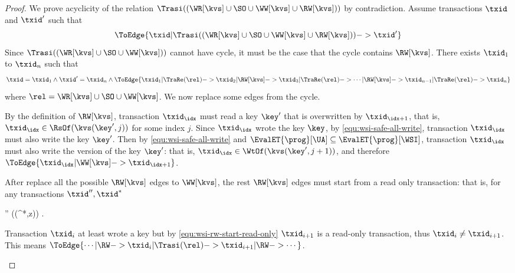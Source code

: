 \begin{proof}
    We prove acyclicity of
    the relation \( \Trasi((\WR[\kvs] \cup \SO \cup \WW[\kvs] \cup \RW[\kvs] )) \) by contradiction.
    Assume transactions \( \txid \) and \( \txid' \) such that
    \[
        \ToEdge{\txid | \Trasi((\WR[\kvs] \cup \SO \cup \WW[\kvs] \cup \RW[\kvs] )) -> \txid'}
    \]
    Since \( \Trasi((\WR[\kvs] \cup \SO \cup \WW[\kvs])) \) cannot have cycle,
    it must be the case that the cycle contains \( \RW[\kvs] \).
    There exists \( \txid_1 \) to \( \txid_n \) such that
    \[
        \txid = \txid_1 \land \txid' = \txid_n 
        \land \ToEdge{\txid_1 | \TraRe(\rel) -> \txid_2 | \RW[\kvs] 
                        -> \txid_3 | \TraRe(\rel) -> \cdots | \RW[\kvs] 
                        -> \txid_{n-1} | \TraRe(\rel) -> \txid_n} 
    \]
    where \( \rel  = \WR[\kvs] \cup \SO \cup \WW[\kvs] \).
    We now replace some edges from the cycle.
    \begin{enumerate}
        By the definition of \( \RW[\kvs] \),
        transaction \( \txid_\idx \) must read a key \( \key' \) that is overwritten by \( \txid_{\idx+1} \), 
        that is, \( \txid_\idx \in \RsOf(\kvs(\key', j))\) for some index \( j \).
        Since \(\txid_\idx \) wrote the key \( \key \), by \cref{equ:wsi-safe-all-write},
        transaction \(\txid_\idx\) must also write the key \( \key' \).
        Then by \cref{equ:wsi-safe-all-write} and \( \EvalET{\prog}[\UA] \subseteq \EvalET{\prog}[\WSI] \),
        transaction \(\txid_\idx\) must also write the  version of the key \( \key' \):
        that is, \( \txid_\idx \in \WtOf(\kvs(\key', j+1)) \),
        and therefore \( \ToEdge{ \txid_\idx | \WW[\kvs] ->\txid_{\idx+1} } \).

        After replace all the possible \( \RW[\kvs] \) edges to \( \WW[\kvs] \), 
        the rest \( \RW[\kvs] \) edges must start from a read only transaction:
        that is, for any transactions \( \txid'',\txid^* \)
        \begin{Formulae}
        \begin{Formula}
             \implies 
             \txid'' \neq \WtOf(\kvs(\key^*,z)) .
            \label{equ:wsi-rw-start-read-only}
        \end{Formula}
        \end{Formulae}
        Transaction \( \txid_i \) at least wrote a key 
        but by \cref{equ:wsi-rw-start-read-only} \( \txid_{i+1}\) is a read-only transaction,
        thus \( \txid_i \neq \txid_{i+1}\).
        This means \( \ToEdge{ \cdots | \RW -> \txid_i | \Trasi(\rel) -> \txid_{i+1} | \RW -> \cdots } \).


\end{enumerate}
\end{proof}
